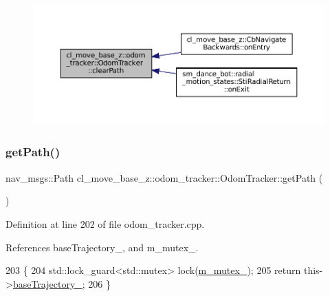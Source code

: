 \begin{figure}[H]
\begin{center}
\leavevmode
\includegraphics[width=350pt]{classcl__move__base__z_1_1odom__tracker_1_1OdomTracker_a93a14e15e3e623f530e056f403bf7644_icgraph}
\end{center}
\end{figure}
\mbox{\label{classcl__move__base__z_1_1odom__tracker_1_1OdomTracker_a762bc88653ebb7d78e693ba465fb160f}} 
\subsubsection{\texorpdfstring{get\+Path()}{getPath()}}
{\footnotesize\ttfamily nav\+\_\+msgs\+::\+Path cl\+\_\+move\+\_\+base\+\_\+z\+::odom\+\_\+tracker\+::\+Odom\+Tracker\+::get\+Path (\begin{DoxyParamCaption}{ }\end{DoxyParamCaption})}



Definition at line 202 of file odom\+\_\+tracker.\+cpp.



References base\+Trajectory\+\_\+, and m\+\_\+mutex\+\_\+.


\begin{DoxyCode}
203 \{
204   std::lock\_guard<std::mutex> lock(\hyperlink{classcl__move__base__z_1_1odom__tracker_1_1OdomTracker_aa371639e1eee269273dec8d3ab9dba0f}{m\_mutex\_});
205   \textcolor{keywordflow}{return} this->\hyperlink{classcl__move__base__z_1_1odom__tracker_1_1OdomTracker_a466d18a86df049f0f680e043bb5ea91f}{baseTrajectory\_};
206 \}
\end{DoxyCode}
\mbox{\label{classcl__move__base__z_1_1odom__tracker_1_1OdomTracker_a9d10e6ce0f462a0cf41db7488ea00494}} 
